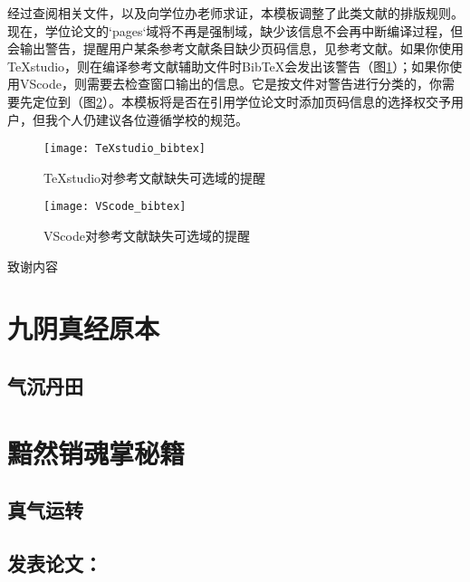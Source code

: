 \documentclass[print, doctor, vlined]{DissertUESTC}
\begin{document}
\begin{itemize}
		经过查阅相关文件，以及向学位办老师求证，本模板调整了此类文献的排版规则。现在，学位论文的`pages`域将不再是强制域，缺少该信息不会再中断编译过程，但会输出警告，提醒用户某条参考文献条目缺少页码信息，见参考文献\cite{陈念永2001毫米波细胞生物效应及抗肿瘤研究无页码}。如果你使用TeXstudio，则在编译参考文献辅助文件时BibTeX会发出该警告（图\ref{fig: TeXstudio对参考文献缺失信息的提醒}）；如果你使用VScode，则需要去检查窗口输出的信息。它是按文件对警告进行分类的，你需要先定位到（图\ref{fig: VScode对参考文献缺失信息的提醒}）。本模板将是否在引用学位论文时添加页码信息的选择权交予用户，但我个人仍建议各位遵循学校的规范。
	\end{itemize}
	
	\begin{figure}[!h]
		\centering
		\texttt{[image: TeXstudio\_bibtex]}
		\caption{TeXstudio对参考文献缺失可选域的提醒} \label{fig: TeXstudio对参考文献缺失信息的提醒}
	\end{figure}
	\begin{figure}[!h]
		\centering
		\texttt{[image: VScode\_bibtex]}
		\caption{VScode对参考文献缺失可选域的提醒} \label{fig: VScode对参考文献缺失信息的提醒}
	\end{figure}
	
	\acknowledgement
	
	致谢内容
	
	
	
	
	
	\appendix
	
	\chapter{九阴真经原本}
	\section{气沉丹田}
	
	\chapter{黯然销魂掌秘籍}
	\section{真气运转}
	
	\achievement %
	
	\section*{发表论文：}
	
\end{document}
